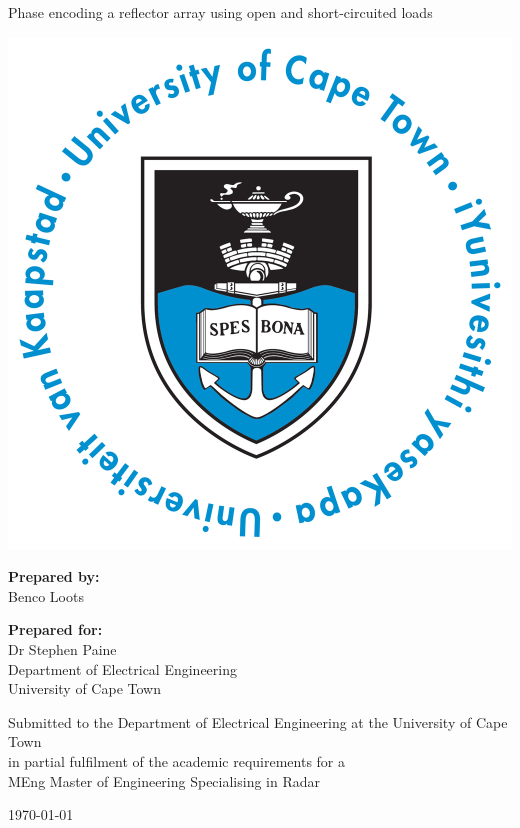 \thispagestyle{empty}
\begin{center}
    
\Huge

\vspace{5cm}

Phase encoding a reflector array using open and short-circuited loads

\vspace{2.5cm}

\includegraphics[width=0.4\linewidth]{FrontMatter/UCT_logo.png}

\vfill

\large
\textbf{Prepared by:}\\
Benco Loots

\vspace{1cm}

\textbf{Prepared for:}\\
Dr Stephen Paine\\
Department of Electrical Engineering\\
University of Cape Town

\vspace{2cm}

\small
Submitted to the Department of Electrical Engineering at the University of Cape Town\\
in partial fulfilment of the academic requirements for a\\
MEng Master of Engineering Specialising in Radar

\vspace{2cm}

\today


\end{center}